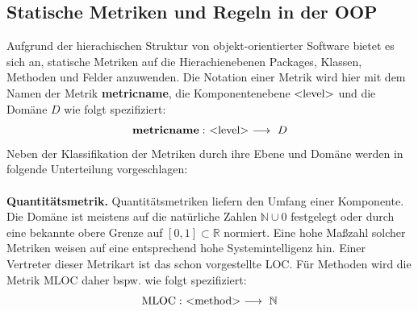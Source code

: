 \documentclass[12pt]{article}
\newcommand{\type}[1]{<\negthickspace\text{#1}\negthickspace> }
\begin{document}
\subsection{Statische Metriken und Regeln in der OOP}

Aufgrund der hierachischen Struktur von objekt-orientierter
Software bietet es sich an, statische Metriken auf die
Hierachienebenen
Packages,
Klassen, Methoden und Felder anzuwenden.
Die Notation einer Metrik wird hier mit dem 
Namen der Metrik \textbf{metricname}, die
Komponentenebene $\type{level}$ und die Domäne $D$ wie folgt
spezifiziert:
\[
        \text{\textbf{metricname}}: ~ 
        \type{level}
        ~ \longrightarrow ~ D 
\]
Neben der Klassifikation der Metriken durch ihre Ebene und Domäne
werden in \cite{Sne10} folgende Unterteilung vorgeschlagen:
\\
\\
\textbf{Quantitätsmetrik.} Quantitätsmetriken liefern den Umfang
einer Komponente. Die Domäne ist meistens auf die natürliche
Zahlen $\mathbb{N} \cup 0$ festgelegt oder durch eine bekannte
obere Grenze auf $[0,1] \subset \mathbb{R}$ normiert. Eine hohe
Maßzahl solcher Metriken weisen auf eine entsprechend hohe
Systemintelligenz hin. Einer Vertreter dieser Metrikart ist das
schon vorgestellte LOC. Für Methoden wird die Metrik MLOC 
daher bspw. wie folgt spezifiziert:
\[
        \text{MLOC}: ~ 
        \type{method}
        ~ \longrightarrow ~ \mathbb{N}
\]
\end{document}
